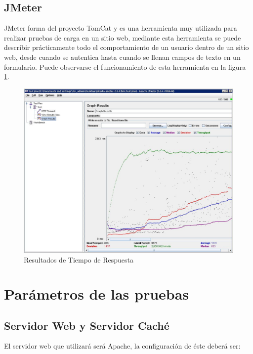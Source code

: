 
\subsection{JMeter}

JMeter forma del proyecto TomCat y es una herramienta muy utilizada para realizar pruebas de carga en un sitio web, mediante esta herramienta se puede describir prácticamente todo el comportamiento de un usuario dentro de un sitio web, desde cuando se autentica hasta cuando se llenan campos de texto en un formulario. Puede observarse el funcionamiento de esta herramienta en la figura \ref{jmeter}.

\begin{figure}[h]
  \centering
    \includegraphics[scale=0.4]{gfx/jmeter}
  \caption{Resultados de Tiempo de Respuesta}
  \label{jmeter}
\end{figure}




\section{Parámetros de las pruebas}
\label{sec:parametros_pruebas}

\subsection{Servidor Web y Servidor Caché}
\label{subsec:servidor_web}
El servidor web que utilizará será Apache, la configuración de éste deberá ser:

